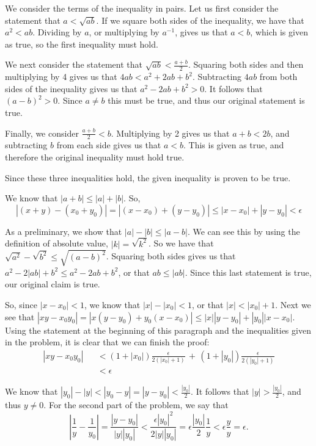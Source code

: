 \begin{problem}[1-7]
We consider the terms of the inequality in pairs. Let us first consider the statement that $a < \sqrt{ab}$. If we square both sides of the inequality, we have that $a^2 < ab$. Dividing by $a$, or multiplying by $a^{-1}$, gives us that $a < b$, which is given as true, so the first inequality must hold.

We next consider the statement that $\sqrt{ab} < \frac{a+b}{2}$. Squaring both sides and then multiplying by 4 gives us that $4ab < a^2 + 2ab + b^2$. Subtracting $4ab$ from both sides of the inequality gives us that $a^2 - 2ab + b^2 > 0$. It follows that $(a-b)^2 > 0$. Since $a \ne b$ this must be true, and thus our original statement is true.

Finally, we consider $\frac{a+b}{2} < b$. Multiplying by 2 gives us that $a + b < 2b$, and subtracting $b$ from each side gives us that $a < b$. This is given as true, and therefore the original inequality must hold true. 

Since these three inequalities hold, the given inequality is proven to be true.
\end{problem}

\begin{problem}[1-20]
We know that $|a + b| \le |a| + |b|$. So,
\[ |(x + y) - (x_0 + y_0)| = |(x - x_0) + (y - y_0)| \le |x - x_0| + |y - y_0| < \epsilon \]
\end{problem}

\begin{problem}[1-21]
As a preliminary, we show that $|a| - |b| \le |a - b|$. We can see this by using the definition of absolute value, $|k| = \sqrt{k^2}$. So we have that $\sqrt{a^2} - \sqrt{b^2} \le \sqrt{(a-b)^2}$. Squaring both sides gives us that $a^2 - 2|ab| + b^2 \le a^2 - 2ab + b^2$, or that $ab \le |ab|$. Since this last statement is true, our original claim is true. 

So, since $|x - x_0| < 1$, we know that $|x| - |x_0| < 1$, or that $|x| < |x_0| + 1$. Next we see that $|xy - x_0y_0| = |x(y - y_0) + y_0(x - x_0)| \le |x||y - y_0| + |y_0||x - x_0|$. Using the statement at the beginning of this paragraph and the inequalities given in the problem, it is clear that we can finish the proof:
\begin{eqnarray*}
|xy - x_0y_0| &&< (1 + |x_0|)\frac{\epsilon}{2(|x_0| + 1)} \,+\, (1 + |y_0|)\frac{\epsilon}{2(|y_0| + 1)} \\
              &&< \epsilon
\end{eqnarray*}
\end{problem}

\begin{problem}[1-22]
We know that $|y_0| - |y| < |y_0 - y| = |y - y_0| < \frac{|y_0|}{2}$. It follows that $|y| > \frac{|y_0|}{2}$, and thus $y \ne 0$. 
For the second part of the problem, we say that 
\[ \left|\frac{1}{y} - \frac{1}{y_0}\right| = \frac{|y - y_0|}{|y||y_0|} < \frac{\epsilon|y_0|^2}{2 |y||y_0|} = \epsilon \frac{|y_0|}{2} \frac{1}{y} < \epsilon \frac{y}{y} = \epsilon. \]
\end{problem}
